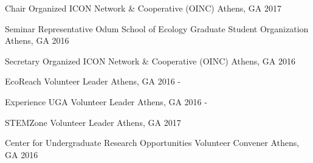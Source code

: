 

\begin{cvhonors}
\cvhonor
    {Chair} %
    {Organized ICON Network \& Cooperative (OINC)} %
    {Athens, GA} %
    {2017} %

\cvhonor
    {Seminar Representative} %
    {Odum School of Ecology Graduate Student Organization} %
    {Athens, GA} %
    {2016} %

\cvhonor
    {Secretary} %
    {Organized ICON Network \& Cooperative (OINC)} %
    {Athens, GA} %
    {2016} %

\end{cvhonors}


\begin{cvhonors}


    \cvhonor
      {EcoReach}
      {Volunteer Leader}
      {Athens, GA}
      {2016 - }

    \cvhonor
      {Experience UGA}
      {Volunteer Leader}
      {Athens, GA}
      {2016 - }

    \cvhonor
      {STEMZone}
      {Volunteer Leader}
      {Athens, GA}
      {2017}

    \cvhonor
      {Center for Undergraduate Research Opportunities} %
      {Volunteer Convener} %
      {Athens, GA} %
      {2016} %
\end{cvhonors}


